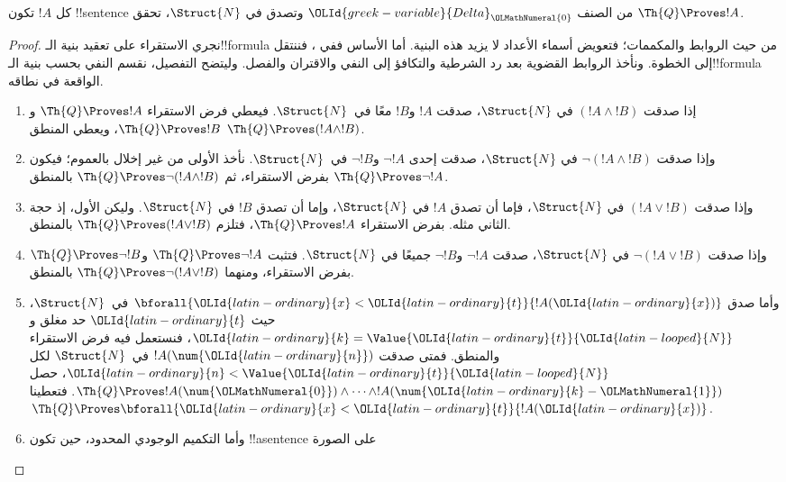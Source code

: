 \documentclass[../../../include/open-logic-section]{subfiles}
\begin{document}
\begin{lem}
كل $!A$ تكون !!{sentence} من الصنف ${\OLId{greek-variable}{Delta}}_{\OLMathNumeral{0}}$ وتصدق في
$\Struct{N}$، تحقق $\Th{Q}\Proves !A$.
\end{lem}

\begin{proof}
نجري الاستقراء على تعقيد بنية الـ!!{formula} من حيث الروابط والمكممات؛
فتعويض أسماء الأعداد لا يزيد هذه البنية.
%
أما الأساس ففي ، فننتقل إلى الخطوة.
ونأخذ الروابط القضوية بعد رد الشرطية والتكافؤ إلى النفي والاقتران والفصل.
وليتضح التفصيل، نقسم النفي بحسب بنية الـ!!{formula} الواقعة في نطاقه.

\begin{enumerate}
\item إذا صدقت $(!A\land !B)$ في $\Struct{N}$، صدقت
$!A$ و$!B$ معًا في~$\Struct{N}$.
فيعطي فرض الاستقراء $\Th{Q}\Proves !A$
و$\Th{Q}\Proves !B$، ويعطي المنطق $\Th{Q}\Proves(!A\land !B)$.
%
\item وإذا صدقت $\lnot(!A\land !B)$ في $\Struct{N}$،
صدقت إحدى $\lnot !A$ و$\lnot !B$ في~$\Struct{N}$.
نأخذ الأولى من غير إخلال بالعموم؛
فيكون $\Th{Q}\Proves\lnot !A$ بفرض الاستقراء،
ثم $\Th{Q}\Proves\lnot(!A\land !B)$ بالمنطق.
%
\item وإذا صدقت $(!A\lor !B)$ في $\Struct{N}$،
فإما أن تصدق $!A$ في $\Struct{N}$، وإما أن تصدق $!B$ في $\Struct{N}$.
وليكن الأول، إذ حجة الثاني مثله.
بفرض الاستقراء $\Th{Q}\Proves !A$،
فتلزم $\Th{Q}\Proves(!A\lor !B)$ بالمنطق.
%
\item وإذا صدقت $\lnot(!A\lor !B)$ في $\Struct{N}$،
صدقت $\lnot !A$ و$\lnot !B$ جميعًا في $\Struct{N}$.
فتثبت $\Th{Q}\Proves\lnot !A$
و$\Th{Q}\Proves\lnot !B$ بفرض الاستقراء،
ومنهما $\Th{Q}\Proves\lnot(!A\lor !B)$ بالمنطق.
%
\item وأما صدق $\bforall{{\OLId{latin-ordinary}{x}}<{\OLId{latin-ordinary}{t}}}{!A({\OLId{latin-ordinary}{x}})}$ في~$\Struct{N}$،
حيث ${\OLId{latin-ordinary}{t}}$ حد مغلق و${\OLId{latin-ordinary}{k}}=\Value{{\OLId{latin-ordinary}{t}}}{{\OLId{latin-looped}{N}}}$، فنستعمل فيه فرض الاستقراء والمنطق.
فمتى صدقت $!A(\num {\OLId{latin-ordinary}{n}})$ في~$\Struct{N}$ لكل
${\OLId{latin-ordinary}{n}}<\Value{{\OLId{latin-ordinary}{t}}}{{\OLId{latin-looped}{N}}}$، حصل
$\Th{Q}\Proves !A(\num {\OLMathNumeral{0}})\land\dots\land !A(\num{{\OLId{latin-ordinary}{k}}-{\OLMathNumeral{1}}})$.
فتعطينا 
$\Th{Q}\Proves\bforall{{\OLId{latin-ordinary}{x}}<{\OLId{latin-ordinary}{t}}}{!A({\OLId{latin-ordinary}{x}})}$.
%
\item وأما التكميم الوجودي المحدود، حين تكون !!a{sentence} على الصورة

\end{enumerate}
\end{proof}
\end{document}
